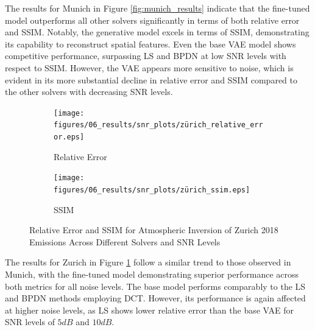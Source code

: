 The results for Munich in Figure \ref{fig:munich_results} indicate that the fine-tuned model outperforms all other solvers significantly in terms of both relative error and \gls{SSIM}.
Notably, the generative model excels in terms of \gls{SSIM}, demonstrating its capability to reconstruct spatial features.
Even the base \gls{VAE} model shows competitive performance, surpassing \gls{LS} and \gls{BPDN} at low \gls{SNR} levels with respect to \gls{SSIM}.
However, the \gls{VAE} appears more sensitive to noise, which is evident in its more substantial decline in relative error and \gls{SSIM} compared to the other solvers with decreasing \gls{SNR} levels.


\begin{figure}[htb]
    \centering
    \begin{subfigure}[b]{0.49\textwidth}
        \centering
        \texttt{[image: figures/06\_results/snr\_plots/zürich\_relative\_error.eps]}
        \caption{Relative Error}
    \end{subfigure}
    \begin{subfigure}[b]{0.49\textwidth}
        \centering
        \texttt{[image: figures/06\_results/snr\_plots/zürich\_ssim.eps]}
        \caption{SSIM}
    \end{subfigure}
    \caption{Relative Error and SSIM for Atmospheric Inversion of Zurich 2018 Emissions Across Different Solvers and SNR Levels}
    \label{fig:zurich_results}
\end{figure}

The results for Zurich in Figure \ref{fig:zurich_results} follow a similar trend to those observed in Munich, with the fine-tuned model demonstrating superior performance across both metrics for all noise levels.
The base model performs comparably to the \gls{LS} and \gls{BPDN} methods employing \gls{DCT}.
However, its performance is again affected at higher noise levels, as LS shows lower relative error than the base \gls{VAE} for \gls{SNR} levels of $5 \unit{dB}$ and $10 \unit{dB}$.

